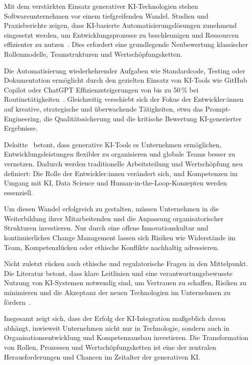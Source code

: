 Mit dem verstärkten Einsatz generativer KI-Technologien stehen
Softwareunternehmen vor einem tiefgreifenden Wandel. Studien und Praxisberichte
zeigen, dass KI-basierte Automatisierungslösungen zunehmend eingesetzt werden,
um Entwicklungsprozesse zu beschleunigen und Ressourcen effizienter zu
nutzen~\cite{siebert_generative_2024,braun_ki_2024}. Dies erfordert eine
grundlegende Neubewertung klassischer Rollenmodelle, Teamstrukturen und
Wertschöpfungsketten.

Die Automatisierung wiederkehrender Aufgaben wie Standardcode, Testing oder
Dokumentation ermöglicht durch den gezielten Einsatz von KI-Tools wie GitHub
Copilot oder ChatGPT Effizienzsteigerungen von bis zu 50\,\% bei
Routinetätigkeiten~\cite{braun_ki_2024,siebert_generative_2024}. Gleichzeitig
verschiebt sich der Fokus der Entwickler:innen auf kreative, strategische und
überwachende Tätigkeiten, etwa das Prompt-Engineering, die Qualitätssicherung
und die kritische Bewertung KI-generierter Ergebnisse.

Deloitte~\cite{s_future_2024} betont, dass generative KI-Tools es Unternehmen
ermöglichen, Entwicklungsleistungen flexibler zu organisieren und globale Teams
besser zu vernetzen. Dadurch werden traditionelle Arbeitsteilung und
Wertschöpfung neu definiert: Die Rolle der Entwickler:innen verändert sich, und
Kompetenzen im Umgang mit KI, Data Science und Human-in-the-Loop-Konzepten
werden essenziell.

Um diesen Wandel erfolgreich zu gestalten, müssen Unternehmen in die
Weiterbildung ihrer Mitarbeitenden und die Anpassung organisatorischer
Strukturen investieren. Nur durch eine offene Innovationskultur und
kontinuierliches Change Management lassen sich Risiken wie Widerstände im Team,
Kompetenzlücken oder ethische Konflikte nachhaltig adressieren.

Nicht zuletzt rücken auch ethische und regulatorische Fragen in den
Mittelpunkt. Die Literatur betont, dass klare Leitlinien und eine
verantwortungsbewusste Nutzung von KI-Systemen notwendig sind, um Vertrauen zu
schaffen, Risiken zu minimieren und die Akzeptanz der neuen Technologien im
Unternehmen zu fördern~\cite{siebert_generative_2024}.

Insgesamt zeigt sich, dass der Erfolg der KI-Integration maßgeblich davon
abhängt, inwieweit Unternehmen nicht nur in Technologie, sondern auch in
Organisationsentwicklung und Kompetenzausbau investieren. Die Transformation
von Rollen, Prozessen und Wertschöpfungsketten ist eine der zentralen
Herausforderungen und Chancen im Zeitalter der generativen KI.

